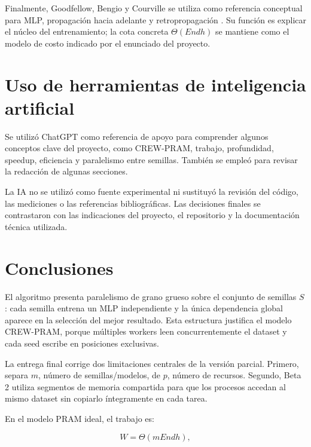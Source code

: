 \documentclass[11pt,a4paper]{article}
\begin{document}
Finalmente, Goodfellow, Bengio y Courville se utiliza como referencia conceptual para
MLP, propagación hacia adelante y retropropagación \cite{goodfellow2016}. Su función
es explicar el núcleo del entrenamiento; la cota concreta
$\Theta(E n d h)$ se mantiene como el modelo de costo indicado por el enunciado del
proyecto.

\section{Uso de herramientas de inteligencia artificial}

Se utilizó ChatGPT como referencia de apoyo \cite{openai2026chatgpt} para comprender algunos conceptos clave del
proyecto, como CREW-PRAM, trabajo, profundidad, speedup, eficiencia y paralelismo entre
semillas. También se empleó para revisar la redacción de algunas secciones.

La IA no se utilizó como fuente experimental ni sustituyó la revisión del código, las
mediciones o las referencias bibliográficas. Las decisiones finales se contrastaron con
las indicaciones del proyecto, el repositorio y la documentación técnica utilizada.


\section{Conclusiones}

El algoritmo presenta paralelismo de grano grueso sobre el conjunto de
semillas $S$: cada semilla entrena un MLP independiente y la única dependencia global
aparece en la selección del mejor resultado. Esta estructura justifica el modelo
CREW-PRAM, porque múltiples workers leen concurrentemente el dataset y cada seed escribe
en posiciones exclusivas.

La entrega final corrige dos limitaciones centrales de la versión parcial. Primero,
separa $m$, número de semillas/modelos, de $p$, número de recursos. Segundo, Beta 2
utiliza segmentos de memoria compartida para que los procesos accedan al mismo dataset
sin copiarlo íntegramente en cada tarea.

En el modelo PRAM ideal, el trabajo es:

\begin{equation}
    W=\Theta(m E n d h),
\end{equation}
\end{document}
